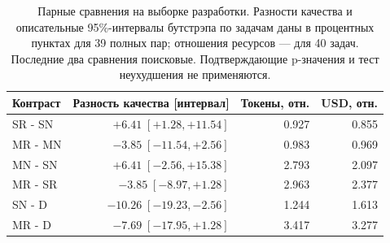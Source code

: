 \begin{table}[htbp]\centering\small
\caption{Парные сравнения на выборке разработки. Разности качества и описательные 95\%-интервалы бутстрэпа по задачам даны в процентных пунктах для 39 полных пар; отношения ресурсов --- для 40 задач. Последние два сравнения поисковые. Подтверждающие p-значения и тест неухудшения не применяются.}\label{tab:dev40-contrasts}
\begin{tabular}{lrrr}\toprule
Контраст & Разность качества [интервал] & Токены, отн. & USD, отн.\\
\midrule
SR - SN & $+6.41\;[+1.28,+11.54]$ & 0.927 & 0.855\\
MR - MN & $-3.85\;[-11.54,+2.56]$ & 0.983 & 0.969\\
MN - SN & $+6.41\;[-2.56,+15.38]$ & 2.793 & 2.097\\
MR - SR & $-3.85\;[-8.97,+1.28]$ & 2.963 & 2.377\\
SN - D & $-10.26\;[-19.23,-2.56]$ & 1.244 & 1.613\\
MR - D & $-7.69\;[-17.95,+1.28]$ & 3.417 & 3.277\\
\bottomrule\end{tabular}\end{table}
